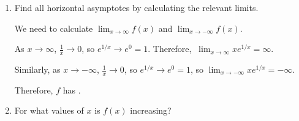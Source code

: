\documentclass{article}
\begin{document}
\begin{enumerate}
\begin{enumerate}
    \begin{solution}
      The only value of $x$ for which $x e^{1/x}$ is undefined is $x
        = 0$ (since then $\frac{1}{x}$ is undefined).

      As $x \to 0^-$, $\frac{1}{x} \to - \infty$, so $e^{1/x} \to 0$.
      Therefore, $\displaystyle \lim_{x \to 0^-} x e^{1/x} = 0$.

      As $x \to 0^+$, $\frac{1}{x} \to \infty$, so $e^{1/x} \to \infty$.
      Therefore, $\displaystyle \lim_{x \to 0^+} x e^{1/x}$ is a $0 \cdot
      \infty$ limit, and we should rewrite it so that we can use
      L'Hôpital's Rule:
      \begin{align*}
        \lim_{x \to 0^+} x e^{1/x} & \nolheq \lim_{x \to 0^+}
        \frac{e^{1/x}}{x^{-1}} \\
        & \lheq \lim_{x \to 0^+} \frac{e^{1/x} \left( - x^{-2}
          \right)}{-x^{-2}} \\
        & \nolheq \lim_{x \to 0^+} e^{1/x} \\
        & \nolheq \infty
      \end{align*}
      So, to summarize, $\boxed{\lim_{x \to 0^-} x e^{1/x} = 0}$ and
      $\boxed{ \lim_{x \to 0^+} x e^{1/x} = \infty}$. 
    \end{solution}

  \item
    \begin{problem}[\vfill]
      Find all horizontal asymptotes by calculating the relevant
      limits. 
    \end{problem}

    \begin{solution}
      We need to calculate $\displaystyle \lim_{x \to \infty} f(x)$ and
      $\displaystyle \lim_{x \to -\infty} f(x)$.

      As $x \to \infty$, $\frac{1}{x} \to 0$, so $e^{1/x} \to e^0 = 1$.
      Therefore, $\boxed{\ \lim_{x \to \infty} x e^{1/x} = \infty}$.

      Similarly, as $x \to -\infty$, $\frac{1}{x} \to 0$, so $e^{1/x} \to
      e^0 = 1$, so $\boxed{ \lim_{x \to -\infty} x e^{1/x} = - \infty}$.

      Therefore, $f$ has . 
    \end{solution}

  \item
    \begin{problem}[\stretch{2}]
      For what values of $x$ is $f(x)$ increasing? 
    \end{problem}


\end{enumerate}
\end{enumerate}
\end{document}
